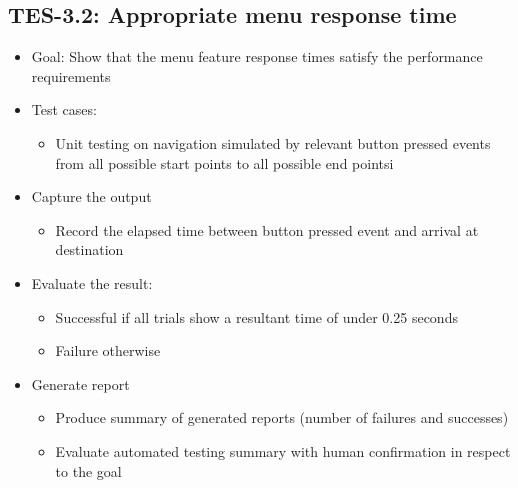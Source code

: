 \subsection{TES-3.2: Appropriate menu response time }
\label{subsec:menu}
\begin{itemize}
\item Goal: Show that the menu feature response times satisfy the performance
requirements

\item Test cases: 
\begin{itemize}
\item Unit testing on navigation simulated by relevant button pressed events from all possible start points to all possible end pointsi
\end{itemize}

\item Capture the output 
\begin{itemize}
\item Record the elapsed time between button pressed event and arrival at destination
\end{itemize}

\item Evaluate the result: 
\begin{itemize}
\item Successful if all trials show a resultant time of under 0.25 seconds
\item Failure otherwise
\end{itemize}

\item Generate report 
\begin{itemize}
\item Produce summary of generated reports (number of failures and successes)
\item Evaluate automated testing summary with human confirmation in respect to the goal
\end{itemize}
\end{itemize}

